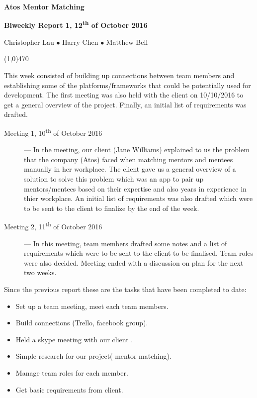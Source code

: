 \documentclass[11pt]{report}
\begin{document}
\centerline{{\LARGE \bf Atos Mentor Matching}}

\centerline{ \large \bf Biweekly Report 1, 12\textsuperscript{th} of October 2016}
\centerline{ Christopher Lau $\bullet$ Harry Chen $\bullet$ Matthew Bell }
\noindent
\line(1,0){470}\\


\smallskip

\noindent
This week consisted of building up connections between team members and establishing some of the platforms/frameworks that could be potentially used for development. The first meeting was also held with the client on 10/10/2016 to get a general overview of the project. Finally, an initial list of requirements was drafted.

\bigskip
{}
\smallskip

\begin{description}
  \item[Meeting 1, 10\textsuperscript{th} of October 2016] --- In the meeting, our client (Jane Williams) explained to us the problem that the company (Atos) faced when matching mentors and mentees manually in her workplace. The client gave us a general overview of a solution to solve this problem which was an app to pair up mentors/mentees based on their expertise and also years in experience in thier workplace. An initial list of requirements was also drafted which were to be sent to the client to finalize by the end of the week.
  \item[Meeting 2, 11\textsuperscript{th} of October 2016] --- In this meeting, team members drafted some notes and a list of requirements which were to be sent to the client to be finalised. Team roles were also decided. Meeting ended with a discussion on plan for the next two weeks.
\end{description}

\bigskip
{}
\smallskip

\noindent
Since the previous report these are the tasks that have been completed to date:
\begin{itemize}
  \item Set up a team meeting, meet each team members.
  \item Build connections (Trello, facebook group).
  \item Held a skype meeting with our client .
  \item Simple research for our project( mentor matching).
  \item Manage team roles for each member.
  \item Get basic requirements from client.
\end{itemize}
\end{document}
